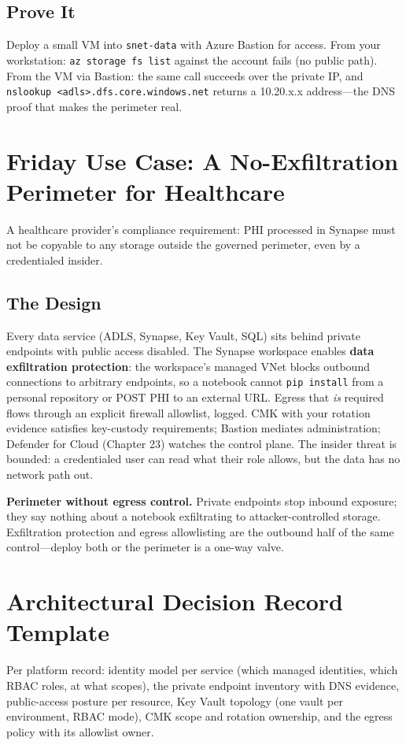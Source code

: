 \subsection{Prove It}
Deploy a small VM into \texttt{snet-data} with Azure Bastion for access. From your workstation: \texttt{az storage fs list} against the account fails (no public path). From the VM via Bastion: the same call succeeds over the private IP, and \texttt{nslookup <adls>.dfs.core.windows.net} returns a 10.20.x.x address---the DNS proof that makes the perimeter real.

\section{Friday Use Case: A No-Exfiltration Perimeter for Healthcare}
A healthcare provider's compliance requirement: PHI processed in Synapse must not be copyable to any storage outside the governed perimeter, even by a credentialed insider.

\subsection{The Design}
Every data service (ADLS, Synapse, Key Vault, SQL) sits behind private endpoints with public access disabled. The Synapse workspace enables \textbf{data exfiltration protection}: the workspace's managed VNet blocks outbound connections to arbitrary endpoints, so a notebook cannot \texttt{pip install} from a personal repository or POST PHI to an external URL. Egress that \emph{is} required flows through an explicit firewall allowlist, logged. CMK with your rotation evidence satisfies key-custody requirements; Bastion mediates administration; Defender for Cloud (Chapter 23) watches the control plane. The insider threat is bounded: a credentialed user can read what their role allows, but the data has no network path out.

\begin{pitfall}
\textbf{Perimeter without egress control.} Private endpoints stop inbound exposure; they say nothing about a notebook exfiltrating to attacker-controlled storage. Exfiltration protection and egress allowlisting are the outbound half of the same control---deploy both or the perimeter is a one-way valve.
\end{pitfall}

\section{Architectural Decision Record Template}
Per platform record: identity model per service (which managed identities, which RBAC roles, at what scopes), the private endpoint inventory with DNS evidence, public-access posture per resource, Key Vault topology (one vault per environment, RBAC mode), CMK scope and rotation ownership, and the egress policy with its allowlist owner.

